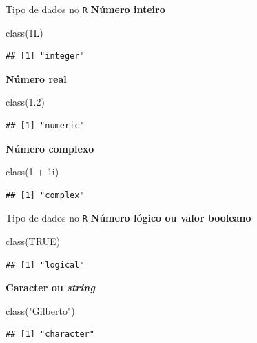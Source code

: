 \documentclass[
  10pt,
  ignorenonframetext,
]{beamer}
\newenvironment{Shaded}{}{}
\newcommand{\DecValTok}[1]{#1}
\newcommand{\FloatTok}[1]{#1}
\newcommand{\KeywordTok}[1]{\textcolor[rgb]{0.00,0.00,1.00}{#1}}
\newcommand{\NormalTok}[1]{#1}
\newcommand{\OperatorTok}[1]{#1}
\newcommand{\OtherTok}[1]{\textcolor[rgb]{1.00,0.25,0.00}{#1}}
\newcommand{\StringTok}[1]{\textcolor[rgb]{0.00,0.50,0.50}{#1}}
\begin{document}
\begin{frame}[fragile]{Tipo de dados no \texttt{R}}
\protect\hypertarget{tipo-de-dados-no-r}{}
\textbf{Número inteiro}

\begin{Shaded}
\begin{Highlighting}[]
\KeywordTok{class}\NormalTok{(1L)}
\end{Highlighting}
\end{Shaded}

\begin{verbatim}
## [1] "integer"
\end{verbatim}

\textbf{Número real}

\begin{Shaded}
\begin{Highlighting}[]
\KeywordTok{class}\NormalTok{(}\FloatTok{1.2}\NormalTok{)}
\end{Highlighting}
\end{Shaded}

\begin{verbatim}
## [1] "numeric"
\end{verbatim}

\textbf{Número complexo}

\begin{Shaded}
\begin{Highlighting}[]
\KeywordTok{class}\NormalTok{(}\DecValTok{1} \OperatorTok{+}\StringTok{ }\NormalTok{1i)}
\end{Highlighting}
\end{Shaded}

\begin{verbatim}
## [1] "complex"
\end{verbatim}
\end{frame}

\begin{frame}[fragile]{Tipo de dados no \texttt{R}}
\protect\hypertarget{tipo-de-dados-no-r-1}{}
\textbf{Número lógico ou valor booleano}

\begin{Shaded}
\begin{Highlighting}[]
\KeywordTok{class}\NormalTok{(}\OtherTok{TRUE}\NormalTok{)}
\end{Highlighting}
\end{Shaded}

\begin{verbatim}
## [1] "logical"
\end{verbatim}

\textbf{Caracter ou \emph{string}}

\begin{Shaded}
\begin{Highlighting}[]
\KeywordTok{class}\NormalTok{(}\StringTok{"Gilberto"}\NormalTok{)}
\end{Highlighting}
\end{Shaded}

\begin{verbatim}
## [1] "character"
\end{verbatim}
\end{frame}
\end{document}
